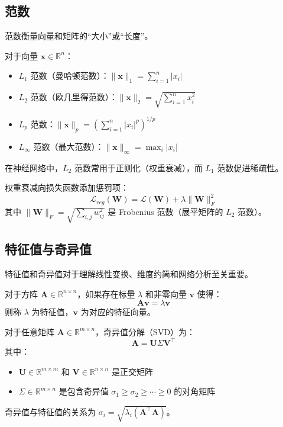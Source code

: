 \subsection{范数}

范数衡量向量和矩阵的``大小''或``长度''。

\begin{定义}[向量范数]
对于向量 $\mathbf{x} \in \mathbb{R}^n$：
\begin{itemize}
    \item $L_1$ 范数（曼哈顿范数）：$\|\mathbf{x}\|_1 = \sum_{i=1}^{n} |x_i|$
    \item $L_2$ 范数（欧几里得范数）：$\|\mathbf{x}\|_2 = \sqrt{\sum_{i=1}^{n} x_i^2}$
    \item $L_p$ 范数：$\|\mathbf{x}\|_p = \left(\sum_{i=1}^{n} |x_i|^p\right)^{1/p}$
    \item $L_\infty$ 范数（最大范数）：$\|\mathbf{x}\|_\infty = \max_i |x_i|$
\end{itemize}
\end{定义}

在神经网络中，$L_2$ 范数常用于正则化（权重衰减），而 $L_1$ 范数促进稀疏性。

\begin{示例}[权重衰减正则化]
权重衰减向损失函数添加惩罚项：
\begin{equation}
\mathcal{L}_{reg}(\mathbf{W}) = \mathcal{L}(\mathbf{W}) + \lambda \|\mathbf{W}\|_F^2
\end{equation}
其中 $\|\mathbf{W}\|_F = \sqrt{\sum_{i,j} w_{ij}^2}$ 是 Frobenius 范数（展平矩阵的 $L_2$ 范数）。
\end{示例}

\subsection{特征值与奇异值}

特征值和奇异值对于理解线性变换、维度约简和网络分析至关重要。

\begin{定义}[特征值与特征向量]
对于方阵 $\mathbf{A} \in \mathbb{R}^{n \times n}$，如果存在标量 $\lambda$ 和非零向量 $\mathbf{v}$ 使得：
\begin{equation}
\mathbf{A}\mathbf{v} = \lambda \mathbf{v}
\end{equation}
则称 $\lambda$ 为特征值，$\mathbf{v}$ 为对应的特征向量。
\end{定义}

\begin{定义}[奇异值分解]
对于任意矩阵 $\mathbf{A} \in \mathbb{R}^{m \times n}$，奇异值分解（SVD）为：
\begin{equation}
\mathbf{A} = \mathbf{U}\Sigma\mathbf{V}^\top
\end{equation}
其中：
\begin{itemize}
    \item $\mathbf{U} \in \mathbb{R}^{m \times m}$ 和 $\mathbf{V} \in \mathbb{R}^{n \times n}$ 是正交矩阵
    \item $\Sigma \in \mathbb{R}^{m \times n}$ 是包含奇异值 $\sigma_1 \geq \sigma_2 \geq \cdots \geq 0$ 的对角矩阵
\end{itemize}
奇异值与特征值的关系为 $\sigma_i = \sqrt{\lambda_i(\mathbf{A}^\top\mathbf{A})}$。
\end{定义}

